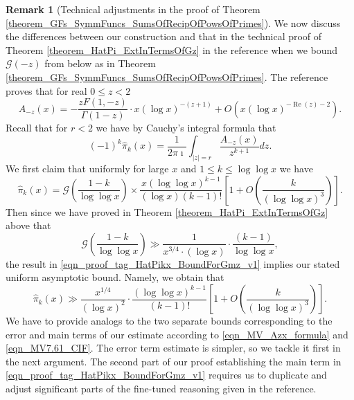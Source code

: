 \documentclass[11pt,reqno,a4letter]{article}
\numberwithin{figure}{section}
\numberwithin{table}{section}
\theoremstyle{plain}
\numberwithin{theorem}{section}
\theoremstyle{definition}
\newtheorem{remark}[theorem]{Remark}
\renewcommand{\Re}{\operatorname{Re}}
\begin{document}
\begin{remark}[Technical adjustments in the proof of Theorem \ref{theorem_GFs_SymmFuncs_SumsOfRecipOfPowsOfPrimes}] 
\label{remark_TechAdjustments_theorem_HatPi_ExtInTermsOfGz_TO_GFs_SymmFuncs_SumsOfRecipOfPowsOfPrimes} 
We now discuss the differences between our construction and that in 
the technical proof of Theorem \ref{theorem_HatPi_ExtInTermsOfGz} 
in the reference when we bound $\mathcal{G}(-z)$ from below as in 
Theorem \ref{theorem_GFs_SymmFuncs_SumsOfRecipOfPowsOfPrimes}. 
The reference proves that for real $0 \leq z < 2$ 
\begin{equation} 
\label{eqn_MV_Azx_formula} 
A_{-z}(x) = -\frac{z F(1, -z)}{\Gamma(1-z)} \cdot x (\log x)^{-(z+1)} + 
     O\left(x (\log x)^{-\Re(z) - 2}\right). 
\end{equation}
Recall that for $r < 2$ we have by Cauchy's integral formula that 
\begin{equation} 
\label{eqn_MV7.61_CIF} 
(-1)^{k} \widehat{\pi}_k(x) = \frac{1}{2\pi\imath} \int_{|z|=r} 
     \frac{A_{-z}(x)}{z^{k+1}} dz. 
\end{equation} 
We first claim that uniformly for large $x$ and $1 \leq k \leq \log\log x$ we have 
\begin{equation} 
\label{eqn_proof_tag_HatPikx_BoundForGmz_v1} 
\widehat{\pi}_k(x) = \mathcal{G}\left(\frac{1-k}{\log\log x}\right) \times 
     \frac{x (\log\log x)^{k-1}}{(\log x) (k-1)!} 
     \left[1 + O\left(\frac{k}{(\log\log x)^3}\right)\right]. 
\end{equation} 
Then since we have proved in Theorem \ref{theorem_HatPi_ExtInTermsOfGz} 
above that 
\[
\mathcal{G}\left(\frac{1-k}{\log\log x}\right) \gg 
     \frac{1}{x^{3/4} \cdot (\log x)} \cdot 
     \frac{(k-1)}{\log\log x}, 
\]
the result in \eqref{eqn_proof_tag_HatPikx_BoundForGmz_v1} implies our 
stated uniform asymptotic bound. Namely, we obtain that 
\[
\widehat{\pi}_k(x) \gg 
     \frac{x^{1/4}}{(\log x)^{2}} \cdot 
     \frac{(\log\log x)^{k-1}}{(k-1)!} \left[1 + 
     O\left(\frac{k}{(\log\log x)^3}\right)\right]. 
\]
We have to provide analogs to the two separate bounds corresponding to the error and 
main terms of our estimate according to 
\eqref{eqn_MV_Azx_formula} and \eqref{eqn_MV7.61_CIF}. 
The error term estimate is simpler, so we tackle it first in the next argument. 
The second part of our proof establishing the main term in 
\eqref{eqn_proof_tag_HatPikx_BoundForGmz_v1} 
requires us to duplicate and adjust significant parts of the 
fine-tuned reasoning given in the reference. \\ 

\end{remark}
\end{document}
